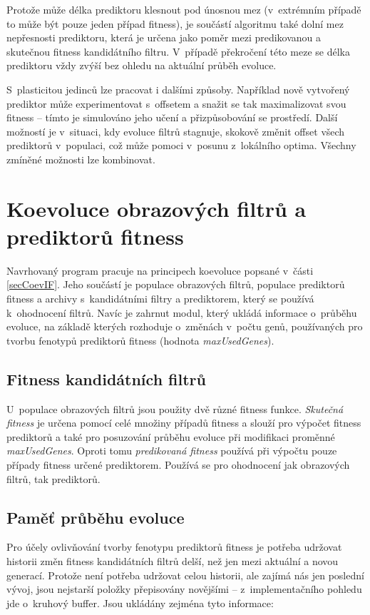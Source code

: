 Protože může délka prediktoru klesnout pod únosnou mez (v~extrémním případě to může být pouze jeden případ fitness), je součástí algoritmu také dolní mez nepřesnosti prediktoru, která je určena jako poměr mezi predikovanou a skutečnou fitness kandidátního filtru. V~případě překročení této meze se délka prediktoru vždy zvýší bez ohledu na aktuální průběh evoluce.

S~plasticitou jedinců lze pracovat i dalšími způsoby. Například nově vytvořený prediktor může experimentovat s~offsetem a snažit se tak maximalizovat svou fitness -- tímto je simulováno jeho učení a přizpůsobování se prostředí. Další možností je v~situaci, kdy evoluce filtrů stagnuje, skokově změnit offset všech prediktorů v~populaci, což může pomoci v~posunu z~lokálního optima. Všechny zmíněné možnosti lze kombinovat.

\section{Koevoluce obrazových filtrů a prediktorů fitness}
\label{secDesignCoev}

Navrhovaný program pracuje na principech koevoluce popsané v~části \ref{secCoevIF}. Jeho součástí je populace obrazových filtrů, populace prediktorů fitness a archivy s~kandidátními filtry a prediktorem, který se používá k~ohodnocení filtrů. Navíc je zahrnut modul, který ukládá informace o~průběhu evoluce, na základě kterých rozhoduje o~změnách v~počtu genů, používaných pro tvorbu fenotypů prediktorů fitness (hodnota \emph{maxUsedGenes}).

\subsection{Fitness kandidátních filtrů}

U~populace obrazových filtrů jsou použity dvě různé fitness funkce. \emph{Skutečná fitness} je určena pomocí celé množiny případů fitness a slouží pro výpočet fitness prediktorů a také pro posuzování průběhu evoluce při modifikaci proměnné \emph{maxUsedGenes}. Oproti tomu \emph{predikovaná fitness} používá při výpočtu pouze případy fitness určené prediktorem. Používá se pro ohodnocení jak obrazových filtrů, tak prediktorů.

\subsection{Paměť průběhu evoluce}

Pro účely ovlivňování tvorby fenotypu prediktorů fitness je potřeba udržovat historii změn fitness kandidátních filtrů delší, než jen mezi aktuální a novou generací. Protože není potřeba udržovat celou historii, ale zajímá nás jen poslední vývoj, jsou nejstarší položky přepisovány novějšími -- z~implementačního pohledu jde o~kruhový buffer. Jsou ukládány zejména tyto informace:

